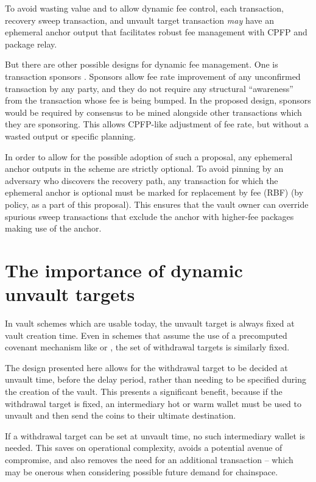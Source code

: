 \documentclass[10pt]{article}
\begin{document}
To avoid wasting value and to allow dynamic fee control, each \opuv{} transaction,
recovery sweep transaction, and unvault target transaction \emph{may} have an ephemeral
anchor output that facilitates robust fee management with CPFP and package relay.

But there are other possible designs for dynamic fee management. One is transaction
sponsors \cite{Sponsors}. Sponsors allow fee rate improvement of any unconfirmed
transaction by any party, and they do not require any structural ``awareness'' from the
transaction whose fee is being bumped. In the proposed design, sponsors would be
required by consensus to be mined alongside other transactions which they are
sponsoring. This allows CPFP-like adjustment of fee rate, but without a wasted output
or specific planning.

In order to allow for the possible adoption of such a proposal, any ephemeral anchor
outputs in the \opv{} scheme are strictly optional. To avoid pinning by an adversary
who discovers the recovery path, any transaction for which the ephemeral anchor is
optional must be marked for replacement by fee (RBF) (by policy, as a part of this
proposal). This ensures that the vault owner can override spurious sweep transactions
that exclude the anchor with higher-fee packages making use of the anchor.

\section*{The importance of dynamic unvault targets}

In vault schemes which are usable today, the unvault target is always fixed at vault
creation time. Even in schemes that assume the use of a precomputed covenant mechanism
like  or , the set of withdrawal targets is
similarly fixed.

The design presented here allows for the withdrawal target to be decided at unvault
time, before the delay period, rather than needing to be specified during the creation
of the vault. This presents a significant benefit, because if the withdrawal target is
fixed, an intermediary hot or warm wallet must be used to unvault and then send the
coins to their ultimate destination.

If a withdrawal target can be set at unvault time, no such intermediary wallet is
needed. This saves on operational complexity, avoids a potential avenue of compromise,
and also removes the need for an additional transaction -- which may be onerous when 
considering possible future demand for chainspace.
\end{document}
